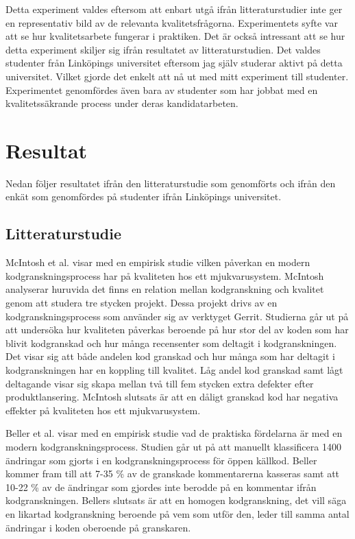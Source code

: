 Detta experiment valdes eftersom att enbart utgå ifrån litteraturstudier inte ger en representativ bild av de relevanta kvalitetsfrågorna. Experimentets syfte var att se hur kvalitets\-arbete fungerar i praktiken. Det är också intressant att se hur detta experiment skiljer sig ifrån resultatet av litteraturstudien. Det valdes studenter från Linköpings universitet eftersom jag själv studerar aktivt på detta universitet. Vilket gjorde det enkelt att nå ut med mitt experiment till studenter. Experimentet genomfördes även bara av studenter som har jobbat med en kvalitetssäkrande process under deras kandidatarbeten.

\section{Resultat}
\label{sec:results-wallstrom}
Nedan följer resultatet ifrån den litteraturstudie som genomförts och ifrån den enkät som genomfördes på studenter ifrån Linköpings universitet. 

\subsection{Litteraturstudie}
McIntosh et al. \cite{mcintosh2014impact} visar med en empirisk studie vilken påverkan en modern kodgranskningsprocess har på kvaliteten hos ett mjukvarusystem. McIntosh analyserar huruvida det finns en relation mellan kodgranskning och kvalitet genom att studera tre stycken projekt. Dessa projekt drivs av en kodgranskningsprocess som använder sig av verktyget Gerrit. Studierna går ut på att undersöka hur kvaliteten påverkas beroende på hur stor del av koden som har blivit kodgranskad och hur många recensenter som deltagit i kodgranskningen. Det visar sig att både andelen kod granskad och hur många som har deltagit i kodgranskningen har en koppling till kvalitet. Låg andel kod granskad samt lågt deltagande visar sig skapa mellan två till fem stycken extra defekter efter produktlansering. McIntosh slutsats är att en dåligt granskad kod har negativa effekter på kvaliteten hos ett mjukvarusystem.

Beller et al. \cite{beller2014modern} visar med en empirisk studie vad de praktiska fördelarna är med en modern kodgranskningsprocess. Studien går ut på att manuellt klassificera 1400 ändringar som gjorts i en kodgranskningsprocess för öppen källkod. Beller kommer fram till att 7-35 \% av de granskade kommentarerna kasseras samt att 10-22 \% av de ändringar som gjordes inte berodde på en kommentar ifrån kodgranskningen. Bellers slutsats är att en homogen kodgranskning, det vill säga en likartad kodgranskning beroende på vem som utför den, leder till samma antal ändringar i koden oberoende på granskaren.

